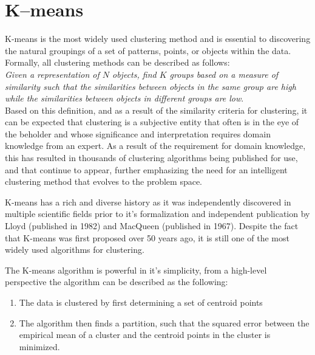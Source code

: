\documentclass{article}
\begin{document}
\section{K--means}

K-means is the most widely used clustering method and is essential to discovering the natural groupings of a set of patterns, points, or objects within the data. Formally, all clustering methods can be described as follows:\\

\emph{Given a representation of $N$ objects, find $K$ groups based on a measure of similarity such that the similarities between objects in the same group are high while the similarities between objects in different groups are low}\cite{jain2010}.\\

Based on this definition, and as a result of the similarity criteria for clustering, it can be expected that clustering is a subjective entity that often is in the eye of the beholder and whose significance and interpretation requires domain knowledge from an expert. As a result of the requirement for domain knowledge, this has resulted in thousands of clustering algorithms being published for use, and that continue to appear\cite{jain2010}, further emphasizing the need for an intelligent clustering method that evolves to the problem space.

K-means has a rich and diverse history as it was independently discovered in multiple scientific fields prior to it's formalization and independent publication by Lloyd (published in 1982)\cite{lloyd1982least} and MacQueen (published in 1967)\cite{macqueen1967some}. Despite the fact that K-means was first proposed over 50 years ago, it is still one of the most widely used algorithms for clustering\cite{jain2010}.

The K-means algorithm is powerful in it's simplicity, from a high-level perspective the algorithm can be described as the following:


\begin{enumerate}
\item The data is clustered by first determining a set of centroid points

\item The algorithm then finds a partition, such that the squared error between the empirical mean of a cluster and the centroid points in the cluster is minimized\cite{macqueen1967some, lloyd1982least}.

\end{enumerate}
\end{document}
